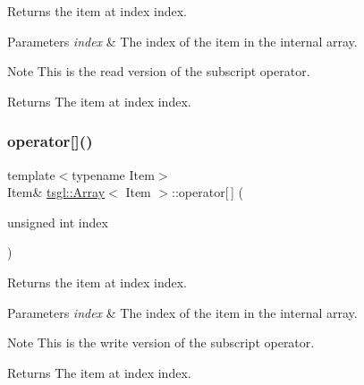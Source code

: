 Returns the item at index {\ttfamily index}. 


\begin{DoxyParams}{Parameters}
{\em index} & The index of the item in the internal array. \\
\hline
\end{DoxyParams}
\begin{DoxyNote}{Note}
This is the read version of the subscript operator. 
\end{DoxyNote}
\begin{DoxyReturn}{Returns}
The item at index {\ttfamily index}. 
\end{DoxyReturn}
\mbox{\label{classtsgl_1_1_array_ae98fe9dc7998ec3b694150a8f70d8423}} 
\subsubsection{\texorpdfstring{operator[]()}{operator[]()}\hspace{0.1cm}{\footnotesize\ttfamily [2/2]}}
{\footnotesize\ttfamily template$<$typename Item$>$ \\
Item\& \hyperlink{classtsgl_1_1_array}{tsgl\+::\+Array}$<$ Item $>$\+::operator\mbox{[}$\,$\mbox{]} (\begin{DoxyParamCaption}\item[{unsigned int}]{index }\end{DoxyParamCaption})\hspace{0.3cm}{\ttfamily [inline]}}



Returns the item at index {\ttfamily index}. 


\begin{DoxyParams}{Parameters}
{\em index} & The index of the item in the internal array. \\
\hline
\end{DoxyParams}
\begin{DoxyNote}{Note}
This is the write version of the subscript operator. 
\end{DoxyNote}
\begin{DoxyReturn}{Returns}
The item at index {\ttfamily index}. 
\end{DoxyReturn}
\mbox{\label{classtsgl_1_1_array_aca25dfa4218b2c872d1e1cd2a1a32caa}} 
